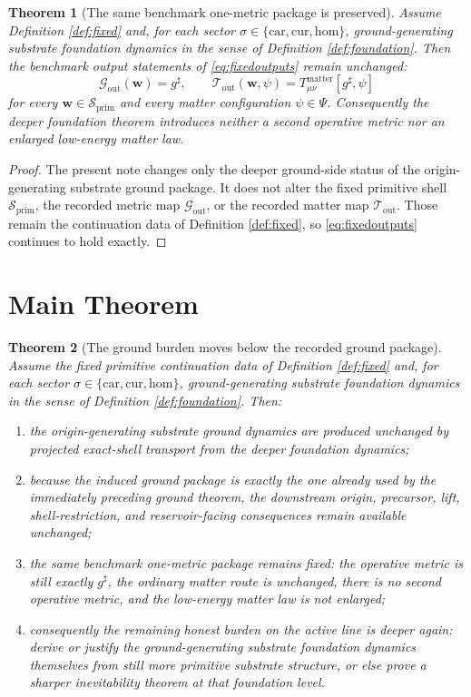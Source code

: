 \documentclass[11pt]{article}
\newcommand{\CompletedMetric}{g^{\sharp}}
\newcommand{\Car}{\mathrm{car}}
\newcommand{\Cur}{\mathrm{cur}}
\newcommand{\Hom}{\mathrm{hom}}
\newcommand{\PrimShell}{\mathcal S_{\mathrm{prim}}}
\newcommand{\MetricOut}{\mathscr G_{\mathrm{out}}}
\newcommand{\MatterOut}{\mathscr T_{\mathrm{out}}}
\newtheorem{theorem}{Theorem}
\begin{document}
\begin{theorem}[The same benchmark one-metric package is preserved]
\label{thm:outputs}
Assume Definition \ref{def:fixed} and, for each sector \(\sigma\in\{\Car,\Cur,\Hom\}\), ground-generating substrate foundation dynamics in the sense of Definition \ref{def:foundation}. Then the benchmark output statements of \eqref{eq:fixedoutputs} remain unchanged:
\[
\MetricOut(\mathbf w)=\CompletedMetric,
\qquad
\MatterOut(\mathbf w,\psi)
=
T_{\mu\nu}^{\mathrm{matter}}[\CompletedMetric,\psi]
\]
for every \(\mathbf w\in\PrimShell\) and every matter configuration \(\psi\in\Psi\). Consequently the deeper foundation theorem introduces neither a second operative metric nor an enlarged low-energy matter law.
\end{theorem}

\begin{proof}
The present note changes only the deeper ground-side status of the origin-generating substrate ground package. It does not alter the fixed primitive shell \(\PrimShell\), the recorded metric map \(\MetricOut\), or the recorded matter map \(\MatterOut\). Those remain the continuation data of Definition \ref{def:fixed}, so \eqref{eq:fixedoutputs} continues to hold exactly.
\end{proof}

\section{Main Theorem}

\begin{theorem}[The ground burden moves below the recorded ground package]
\label{thm:main}
Assume the fixed primitive continuation data of Definition \ref{def:fixed} and, for each sector \(\sigma\in\{\Car,\Cur,\Hom\}\), ground-generating substrate foundation dynamics in the sense of Definition \ref{def:foundation}. Then:
\begin{enumerate}
    \item the origin-generating substrate ground dynamics are produced unchanged by projected exact-shell transport from the deeper foundation dynamics;
    \item because the induced ground package is exactly the one already used by the immediately preceding ground theorem, the downstream origin, precursor, lift, shell-restriction, and reservoir-facing consequences remain available unchanged;
    \item the same benchmark one-metric package remains fixed: the operative metric is still exactly \(\CompletedMetric\), the ordinary matter route is unchanged, there is no second operative metric, and the low-energy matter law is not enlarged;
    \item consequently the remaining honest burden on the active line is deeper again: derive or justify the ground-generating substrate foundation dynamics themselves from still more primitive substrate structure, or else prove a sharper inevitability theorem at that foundation level.
\end{enumerate}
\end{theorem}
\end{document}
